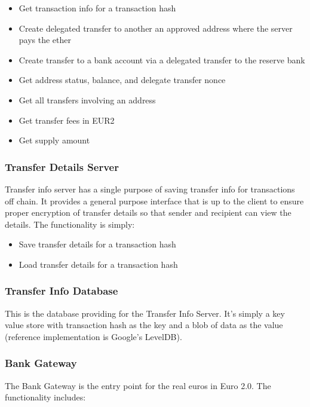 \documentclass[12pt]{article} %
\begin{document}
{\begin{itemize}
	\item Get transaction info for a transaction hash
	\item Create delegated transfer to another an approved address where the server pays the ether
	\item Create transfer to a bank account via a delegated transfer to the reserve bank
	\item Get address status, balance, and delegate transfer nonce
	\item Get all transfers involving an address
	\item Get transfer fees in EUR2
	\item Get supply amount
\end{itemize}

\subsubsection{Transfer Details Server} \label{sssec:3.5:transferDetailsServer}

Transfer info server has a single purpose of saving transfer info for transactions off chain. It provides a general purpose interface that is up to the client to ensure proper encryption of transfer details so that sender and recipient can view the details. The functionality is simply:

\begin{itemize}
	\item Save transfer details for a transaction hash
	\item Load transfer details for a transaction hash
\end{itemize}

\subsubsection{Transfer Info Database} \label{sssec:3.5:transferInfoDatabase}

This is the database providing for the Transfer Info Server. It's simply a key value store with transaction hash as the key and a blob of data as the value (reference implementation is Google's LevelDB).

\subsubsection{Bank Gateway} \label{sssec:3.5:bankGateway}

The Bank Gateway is the entry point for the real euros in Euro 2.0. The functionality includes:

}
\end{document}
